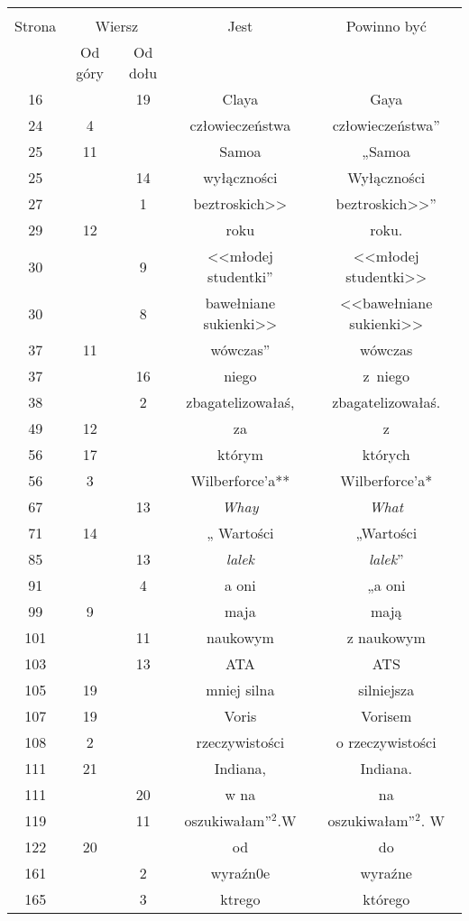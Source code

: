 \documentclass[a4paper,11pt]{article}
\begin{document}
\begin{center}

  \begin{tabular}{|c|c|c|c|c|}
    \hline
    & \multicolumn{2}{c|}{} & & \\
    Strona & \multicolumn{2}{c|}{Wiersz} & Jest
                              & Powinno być \\ \cline{2-3}
    & Od góry & Od dołu & & \\
    \hline
    16  & & 19 & Claya & Gaya \\
    24  &  4 & & człowieczeństwa & człowieczeństwa'' \\
    25  & 11 & & Samoa & „Samoa \\
    25  & & 14 & wyłączności & Wyłączności \\
    27  & &  1 & beztroskich>> & beztroskich>>” \\
    29  & 12 & & roku & roku. \\
    30  & &  9 & <<młodej studentki” %
           & <<młodej studentki>> \\
    30  & &  8 & bawełniane sukienki>> & <<bawełniane sukienki>> \\
    37  & 11 & & wówczas” & wówczas \\
    37  & & 16 & niego & z~niego \\
    38  & &  2 & zbagatelizowałaś, & zbagatelizowałaś. \\
    49  & 12 & & za & z \\
    56  & 17 & & którym & których \\
    56  &  3 & & Wilberforce'a** & Wilberforce'a* \\
    67  & & 13 & \textit{Whay} & \textit{What} \\
    71  & 14 & & „ Wartości & „Wartości \\
    85  & & 13 & \textit{lalek} & \textit{lalek}” \\
    91  & &  4 & a oni & „a oni \\
    99  &  9 & & maja & mają \\
    101 & & 11 & naukowym & z naukowym \\
    103 & & 13 & ATA & ATS \\
    105 & 19 & & mniej silna & silniejsza \\
    107 & 19 & & Voris & Vorisem \\
    108 &  2 & & rzeczywistości & o rzeczywistości \\
    111 & 21 & & Indiana, & Indiana. \\
    111 & & 20 & w na & na \\
    119 & & 11 & oszukiwałam”$^{ 2 }$.W & oszukiwałam”$^{ 2 }$. W \\
    122 & 20 & & od & do \\
    161 & &  2 & wyraźn0e & wyraźne \\
    165 & &  3 & ktrego & którego \\
    \hline
  \end{tabular}






\end{center}
\end{document}
